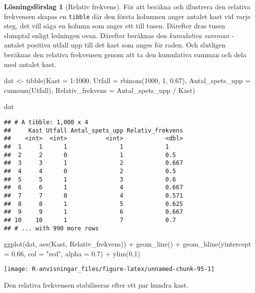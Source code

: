 \documentclass[
]{book}
\newenvironment{Shaded}{\begin{snugshade}}{\end{snugshade}}
\newcommand{\AttributeTok}[1]{\textcolor[rgb]{0.77,0.63,0.00}{#1}}
\newcommand{\DecValTok}[1]{\textcolor[rgb]{0.00,0.00,0.81}{#1}}
\newcommand{\FloatTok}[1]{\textcolor[rgb]{0.00,0.00,0.81}{#1}}
\newcommand{\FunctionTok}[1]{\textcolor[rgb]{0.00,0.00,0.00}{#1}}
\newcommand{\NormalTok}[1]{#1}
\newcommand{\OtherTok}[1]{\textcolor[rgb]{0.56,0.35,0.01}{#1}}
\newcommand{\SpecialCharTok}[1]{\textcolor[rgb]{0.00,0.00,0.00}{#1}}
\newcommand{\StringTok}[1]{\textcolor[rgb]{0.31,0.60,0.02}{#1}}
\theoremstyle{definition}
\theoremstyle{definition}
\theoremstyle{definition}
\theoremstyle{definition}
\newtheorem{hypothesis}{Lösningsförslag}[chapter]
\theoremstyle{remark}
\begin{document}
\begin{hypothesis}[Relativ frekvens]
För att beräkna och illustrera den relativa frekvensen skapas en \texttt{tibble} där den första kolumnen anger antalet kast vid varje steg, det vill säga en kolumn som anger ett till tusen. Därefter dras tusen slumptal enligt ledningen ovan. Därefter beräknas den \emph{kumulativa summan} - antalet positiva utfall upp till det kast som anges för raden. Och slutligen beräknas den relativa frekvensen genom att ta den kumulativa summan och dela med antalet kast.

\begin{Shaded}
\begin{Highlighting}[]
\NormalTok{dat }\OtherTok{\textless{}{-}} \FunctionTok{tibble}\NormalTok{(}\AttributeTok{Kast =} \DecValTok{1}\SpecialCharTok{:}\DecValTok{1000}\NormalTok{,}
              \AttributeTok{Utfall =} \FunctionTok{rbinom}\NormalTok{(}\DecValTok{1000}\NormalTok{, }\DecValTok{1}\NormalTok{, }\FloatTok{0.67}\NormalTok{),}
              \AttributeTok{Antal\_spets\_upp =} \FunctionTok{cumsum}\NormalTok{(Utfall),}
              \AttributeTok{Relativ\_frekvens =}\NormalTok{ Antal\_spets\_upp }\SpecialCharTok{/}\NormalTok{ Kast)}

\NormalTok{dat}
\end{Highlighting}
\end{Shaded}

\begin{verbatim}
## # A tibble: 1,000 x 4
##     Kast Utfall Antal_spets_upp Relativ_frekvens
##    <int>  <int>           <int>            <dbl>
##  1     1      1               1            1    
##  2     2      0               1            0.5  
##  3     3      1               2            0.667
##  4     4      0               2            0.5  
##  5     5      1               3            0.6  
##  6     6      1               4            0.667
##  7     7      0               4            0.571
##  8     8      1               5            0.625
##  9     9      1               6            0.667
## 10    10      1               7            0.7  
## # ... with 990 more rows
\end{verbatim}

\begin{Shaded}
\begin{Highlighting}[]
\FunctionTok{ggplot}\NormalTok{(dat, }\FunctionTok{aes}\NormalTok{(Kast, Relativ\_frekvens)) }\SpecialCharTok{+}
  \FunctionTok{geom\_line}\NormalTok{() }\SpecialCharTok{+}
  \FunctionTok{geom\_hline}\NormalTok{(}\AttributeTok{yintercept =} \FloatTok{0.66}\NormalTok{, }\AttributeTok{col =} \StringTok{"red"}\NormalTok{, }\AttributeTok{alpha =} \FloatTok{0.7}\NormalTok{) }\SpecialCharTok{+}
  \FunctionTok{ylim}\NormalTok{(}\DecValTok{0}\NormalTok{,}\DecValTok{1}\NormalTok{)}
\end{Highlighting}
\end{Shaded}

\begin{center}\texttt{[image: R-anvisningar\_files/figure-latex/unnamed-chunk-95-1]} \end{center}

Den relativa frekvensen stabiliseras efter ett par hundra kast.
\end{hypothesis}
\end{document}
